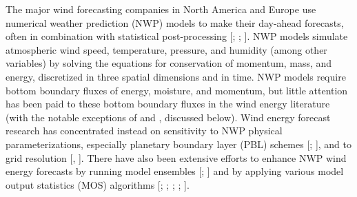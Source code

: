 The major wind forecasting companies in North America and Europe use numerical weather prediction (NWP) models to make their day-ahead forecasts, often in combination with statistical post-processing [\cite{porter2010status}; \cite{foley2012current}; \cite{monteiro2009wind}].  NWP models simulate atmospheric wind speed, temperature, pressure, and humidity (among other variables) by solving the equations for conservation of momentum, mass, and energy, discretized in three spatial dimensions and in time.  NWP models require bottom boundary fluxes of energy, moisture, and momentum, but little attention has been paid to these bottom boundary fluxes in the wind energy literature (with the notable exceptions of \cite{marjanovic2014} and \cite{wharton2011review}, discussed below).  Wind energy forecast research has concentrated instead on sensitivity to NWP physical parameterizations, especially planetary boundary layer (PBL) schemes [\cite{draxl2014evaluating}; \cite{marjanovic2014}], and to grid resolution [\cite{marjanovic2014}, \cite{carvalho2012sensitivity}].  There have also been extensive efforts to enhance NWP wind energy forecasts by running model ensembles [\cite{deppe2013wrf}; \cite{pinson2009ensemble}] and by applying various model output statistics (MOS) algorithms [\cite{bedard2013development}; \cite{ranaboldo2013implementation}; \cite{ellis2014predicting}; \cite{ortiz2011short}; \cite{kusiak2009wind}].



